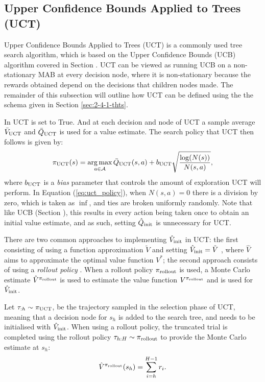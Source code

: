     



    
    \subsection{Upper Confidence Bounds Applied to Trees (UCT)}
    \label{sec:2-4-2-uct}

        Upper Confidence Bounds Applied to Trees (UCT) \cite{uct,uct_long} is a commonly used tree search algorithm, which is based on the Upper Confidence Bounds (UCB)  algorithm covered in Section . UCT can be viewed as running UCB on a non-stationary MAB at every decision node, where it is non-stationary because the rewards obtained depend on the decisions that children nodes made. The remainder of this subsection will outline how UCT can be defined using the the \thtspp schema given in Section \ref{sec:2-4-1-thts}.

        In UCT \mctsmode\ewe is set to True. And at each decision and node of UCT a sample average ${\bar{V}_{{\textnormal{UCT}}}}$ and ${\bar{Q}_{{\textnormal{UCT}}}}$ is used for a value estimate. The search policy that UCT then follows is given by:
        \begin{align}
            {\pi_{{\textnormal{UCT}}}}(s) = \operatorname*{arg\,max}_{a\in\mathcal{A}} {\bar{Q}_{{\textnormal{UCT}}}}(s,a) + b_{{\textnormal{UCT}}} \sqrt{\frac{\log(N(s))}{N(s,a)}}, \label{eq:uct_policy}
        \end{align}
        where $b_{{\textnormal{UCT}}}$ is a \textit{bias} parameter that controls the amount of exploration UCT will perform. In Equation (\ref{eq:uct_policy}), when $N(s,a)=0$ there is a division by zero, which is taken as $\inf$, and ties are broken uniformly randomly. Note that like UCB (Section ), this results in every action being taken once to obtain an initial value estimate, and as such, setting ${\hat{Q}_{\textnormal{init}}}$ is unnecessary for UCT.   
        
        There are two common approaches to implementing ${\hat{V}_{\textnormal{init}}}$ in UCT: the first consisting of using a function approximation $\tilde{V}$ and setting ${\hat{V}_{\textnormal{init}}}=\tilde{V}$ , where $\hat{V}$ aims to approximate the optimal value function $V^*$; the second approach consists of using a \textit{rollout policy} . When a rollout policy ${\pi_{{\textnormal{rollout}}}}$ is used, a Monte Carlo estimate $\hat{V}^{{\pi_{{\textnormal{rollout}}}}}$ is used to estimate the value function $V^{{\pi_{{\textnormal{rollout}}}}}$ and is used for ${\hat{V}_{\textnormal{init}}}$.

        Let $\tau_{:h}\sim{\pi_{{\textnormal{UCT}}}}$, be the trajectory sampled in the selection phase of UCT, meaning that a decision node for $s_h$ is added to the search tree, and needs to be initialised with ${\hat{V}_{\textnormal{init}}}$. When using a rollout policy, the truncated trial is completed using the rollout policy $\tau_{h:H}\sim{\pi_{{\textnormal{rollout}}}}$ to provide the Monte Carlo estimate at $s_h$:
        \begin{align}
            \hat{V}^{{\pi_{{\textnormal{rollout}}}}}(s_h) = \sum_{i=h}^{H-1} r_i. \label{eq:rollout_value_estimate}
        \end{align}

